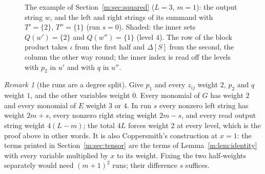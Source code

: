 \documentclass[11pt]{article}
\theoremstyle{definition}
\theoremstyle{remark}
\newtheorem{remark}[theorem]{Remark}
\begin{document}
\begin{figure}[t]
\centering
{}
\caption{The example of Section~\ref{m:sec:squared} ($L=3$, $m=1$): the output string $w$, and the left and right strings of its summand with $T'=\{2\}$, $T''=\{1\}$ (run $s=0$). Shaded: the inner sets $Q(w')=\{2\}$ and $Q(w'')=\{1\}$ (level $4$). The row of the block product takes $\iota$ from the first half and $\Delta[S]$ from the second, the column the other way round; the inner index is read off the levels with $p_2$ in $u'$ and with $q$ in $u''$.}
\label{fig:example}
\end{figure}

\begin{remark}[the runs are a degree split]\label{m:rem:degree}
Give $p_1$ and every $z_{ij}$ weight $2$, $p_2$ and $q$ weight $1$, and the other variables weight $0$. Every monomial of $G$ has weight $2$ and every monomial of $E$ weight $3$ or $4$. In run $s$ every nonzero left string has weight $2m+s$, every nonzero right string weight $2m-s$, and every read output string weight $4(L-m)$; the total $4L$ forces weight $2$ at every level, which is the proof above in other words. It is also Coppersmith's construction at $x=1$: the terms printed in Section~\ref{m:sec:tensor} are the terms of Lemma~\ref{m:lem:identity} with every variable multiplied by $x$ to its weight. Fixing the two half-weights separately would need $(m+1)^2$ runs; their difference $s$ suffices.
\end{remark}
\end{document}

